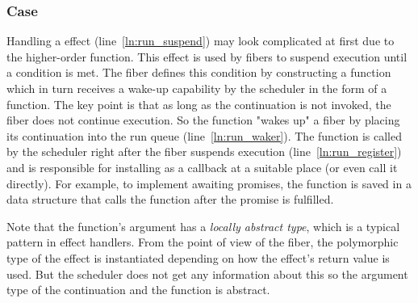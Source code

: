 \subsubsection*{\esuspend{} Case}
Handling a \esuspend{} effect (line~\ref{ln:run_suspend}) may look complicated at first due to the higher-order  function.
This effect is used by fibers to suspend execution until a condition is met.
The fiber defines this condition by constructing a  function which in turn receives a wake-up capability by the scheduler in the form of a  function.
The key point is that as long as the continuation  is not invoked, the fiber does not continue execution.
So the  function "wakes up" a fiber by placing its continuation  into the run queue (line~\ref{ln:run_waker}).
The  function is called by the scheduler right after the fiber suspends execution (line~\ref{ln:run_register}) and is responsible for installing  as a callback at a suitable place (or even call it directly).
For example, to implement awaiting promises, the  function is saved in a data structure that calls the function after the promise is fulfilled.

Note that the  function's argument  has a \emph{locally abstract type}, which is a typical pattern in effect handlers.
From the point of view of the fiber, the polymorphic type  of the \esuspend{} effect is instantiated depending on how the effect's return value is used.
But the scheduler does not get any information about this so the argument type of the continuation  and the  function is abstract.


\subsubsection{}
\label{sec:sched-impl-fork}

